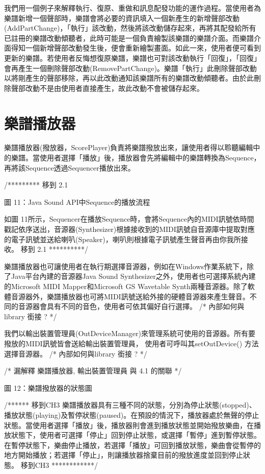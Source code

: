 \documentclass[12pt,a4paper,oneside]{report}
\begin{document}
我們用一個例子來解釋執行、復原、重做和訊息配發功能的運作過程。當使用者為樂譜新增一個聲部時，樂譜會將必要的資訊填入一個新產生的新增聲部改動(AddPartChange)，「執行」該改動，然後將該改動儲存起來，再將其配發給所有已註冊的樂譜改動傾聽者，此時可能是一個負責繪製該樂譜的樂譜介面。而樂譜介面得知一個新增聲部改動發生後，便會重新繪製畫面。如此一來，使用者便可看到更新的樂譜。若使用者反悔想復原樂譜，樂譜也可對該改動執行「回復」，「回復」會再產生一個刪除聲部改動(RemovePartChange)。樂譜「執行」此刪除聲部改動以將剛產生的聲部移除，再以此改動通知該樂譜所有的樂譜改動傾聽者。由於此刪除聲部改動不是由使用者直接產生，故此改動不會被儲存起來。

\section{樂譜播放器}

樂譜播放器(撥放器，ScorePlayer)負責將樂譜撥放出來，讓使用者得以聆聽編輯中的樂譜。當使用者選擇「播放」後，播放器會先將編輯中的樂譜轉換為Sequence，再將該Sequence透過Sequencer播放出來。

/*********  移到 2.1 


圖 11：Java Sound API中Sequence的播放流程

如圖 11所示，Sequencer在播放Sequence時，會將Sequence內的MIDI訊號依時間戳記依序送出，音源器(Synthesizer)根據接收到的MIDI訊號自音源庫中提取對應的電子訊號並送給喇叭(Speaker)，喇叭則根據電子訊號產生聲音再由你我所接收。
移到 2.1    **********/ 


樂譜播放器也可讓使用者在執行期選擇音源器，例如在Windows作業系統下，除了Java平台內建的音源器Java Sound Synthesizer之外，使用者也可選擇系統內建的Microsoft MIDI Mapper和Microsoft GS Wavetable Synth兩種音源器。除了軟體音源器外，樂譜播放器也可將MIDI訊號送給外接的硬體音源器來產生聲音。不同的音源器會具有不同的音色，使用者可依其偏好自行選擇。 /* 內部如何與library 銜接 ?  */

我們以輸出裝置管理員(OutDeviceManager)來管理系統可使用的音源器。所有要撥放的MIDI訊號皆會送給輸出裝置管理員， 使用者可呼叫其setOutDevice() 方法選擇音源器。 /* 內部如何與library 銜接 ?  */

/*  漏解釋 樂譜播放器, 輸出裝置管理員 與 4.1 的關聯  */


圖 12：樂譜撥放器的狀態圖


/****** 移到CH3  
樂譜播放器具有三種不同的狀態，分別為停止狀態(stopped)、播放狀態(playing)及暫停狀態(paused)。在預設的情況下，播放器處於無聲的停止狀態。當使用者選擇「播放」後，播放器則會進到播放狀態並開始撥放樂曲，在播放狀態下，使用者可選擇「停止」回到停止狀態，或選擇「暫停」進到暫停狀態。在暫停狀態下，樂曲停止播放，若選擇「播放」可回到播放狀態，樂曲會從暫停的地方開始播放；若選擇「停止」，則讓播放器捨棄目前的撥放進度並回到停止狀態。
 移到CH3  ************/  
\end{document}
